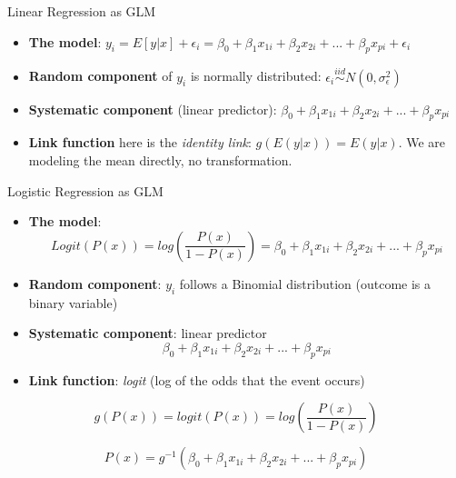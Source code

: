 \documentclass[ignorenonframetext,]{beamer}
\begin{document}
\begin{frame}{Linear Regression as GLM}

\begin{itemize}
\item
  \textbf{The model}:
  \(y_i = E[y|x] + \epsilon_i = \beta_0 + \beta_1 x_{1i} + \beta_2 x_{2i} + ... + \beta_p x_{pi} + \epsilon_i\)
\item
  \textbf{Random component} of \(y_i\) is normally distributed:
  \(\epsilon_i \stackrel{iid}{\sim} N(0, \sigma_\epsilon^2)\)
\item
  \textbf{Systematic component} (linear predictor):
  \(\beta_0 + \beta_1 x_{1i} + \beta_2 x_{2i} + ... + \beta_p x_{pi}\)
\item
  \textbf{Link function} here is the \emph{identity link}:
  \(g(E(y | x)) = E(y | x)\). We are modeling the mean directly, no
  transformation.
\end{itemize}

\end{frame}

\begin{frame}{Logistic Regression as GLM}

\begin{itemize}
\item
  \textbf{The model}: \[
  Logit(P(x)) = log \left( \frac{P(x)}{1-P(x)} \right) = \beta_0 + \beta_1 x_{1i} + \beta_2 x_{2i} + ... + \beta_p x_{pi}
  \]
\item
  \textbf{Random component}: \(y_i\) follows a Binomial distribution
  (outcome is a binary variable)
\item
  \textbf{Systematic component}: linear predictor \[
  \beta_0 + \beta_1 x_{1i} + \beta_2 x_{2i} + ... + \beta_p x_{pi}
  \]
\item
  \textbf{Link function}: \emph{logit} (log of the odds that the event
  occurs)
\end{itemize}

\[
g(P(x)) = logit(P(x)) = log\left( \frac{P(x)}{1-P(x)} \right)
\]

\[
P(x) = g^{-1}\left( \beta_0 + \beta_1 x_{1i} + \beta_2 x_{2i} + ... + \beta_p x_{pi}
 \right)
\]

\end{frame}
\end{document}
